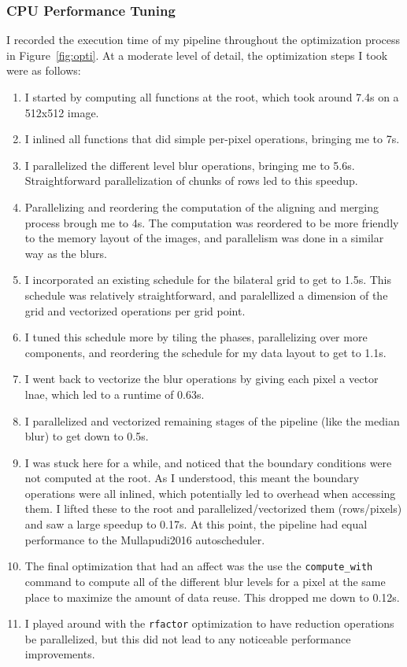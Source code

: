 \documentclass{article}
\begin{document}
\subsubsection{CPU Performance Tuning}

I recorded the execution time of my pipeline throughout the optimization process in Figure~\ref{fig:opti}.
%
At a moderate level of detail, the optimization steps I took were as follows:
\begin{enumerate}
  \item I started by computing all functions at the root, which took around 7.4s on a 512x512 image.
  \item I inlined all functions that did simple per-pixel operations, bringing me to 7s.
  \item I parallelized the different level blur operations, bringing me to 5.6s. Straightforward parallelization
      of chunks of rows led to this speedup.
  \item Parallelizing and reordering the computation of the aligning and merging process brough me to 4s. The computation was
      reordered to be more friendly to the memory layout of the images, and parallelism was done in a similar way as the blurs.
  \item I incorporated an existing schedule for the bilateral grid to get to 1.5s. This schedule was relatively straightforward,
      and paralellized a dimension of the grid and vectorized operations per grid point.
  \item I tuned this schedule more by tiling the phases, parallelizing over more components, and reordering the schedule for my data
      layout to get to 1.1s.
  \item I went back to vectorize the blur operations by giving each pixel a vector lnae, which led to a runtime of 0.63s.
  \item I parallelized and vectorized remaining stages of the pipeline (like the median blur) to get down to 0.5s.
  \item I was stuck here for a while, and noticed that the boundary conditions were not computed at the root. As I understood, this meant
      the boundary operations were all inlined, which potentially led to overhead when accessing them. I lifted these to the root and
      parallelized/vectorized them (rows/pixels) and saw a large speedup to 0.17s. At this point, the pipeline had equal performance to
      the Mullapudi2016 autoscheduler.
  \item The final optimization that had an affect was the use the \texttt{compute\_with} command to compute all of the different blur levels
      for a pixel at the same place to maximize the amount of data reuse. This dropped me down to 0.12s.
  \item I played around with the \texttt{rfactor} optimization to have reduction operations be parallelized, but this did not lead to
      any noticeable performance improvements.
\end{enumerate}
\end{document}
